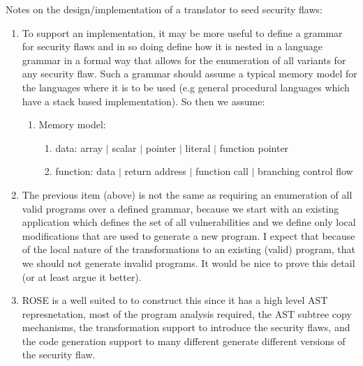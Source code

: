 Notes on the design/implementation of a translator to seed security flaws:
\begin{enumerate}

   \item To support an implementation, it may be more useful to define a grammar for
security flaws and in so doing define how it is nested in a language grammar in a formal
way that allows for the enumeration of all variants for any security flaw.
Such a grammar should assume a typical memory model for the languages
where it is to be used (e.g general procedural languages which have a
stack based implementation).  So then we assume:
      \begin{enumerate}
         \item Memory model:
            \begin{enumerate}
               \item data: array $|$ scalar $|$ pointer $|$ literal $|$ function pointer
               \item function: data $|$ return address $|$ function call $|$ branching control flow
            \end{enumerate}
      \end{enumerate}

   \item The previous item (above) is not the same as requiring an enumeration of all
         valid  programs over
         a defined grammar, because we start with an existing application which defines
         the set of all vulnerabilities and we define only local modifications that
         are used to generate a new program.  I expect that because of the local nature
         of the transformations to an existing (valid) program, that we should not
         generate invalid programs.  It would be nice to prove this detail (or 
         at least argue it better).

   \item ROSE is a well suited to to construct this since it has a high level AST
         represnetation, most of the program analysis required, the AST subtree copy
         mechanisms, the transformation support to introduce the security flaws, and 
         the code generation support to many different generate different versions of
         the security flaw.


\end{enumerate}

